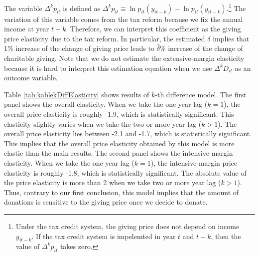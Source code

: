 \documentclass[
  11pt,
  a4paper,
]{article}
\begin{document}
  The variable \(\Delta^k p_{it}\) is defined as \(\Delta^k p_{it} \equiv \ln p_{it}(y_{it-k}) - \ln p_{it}(y_{it-k})\).\footnote{Under the tax credit system, the giving price does not depend on income \(y_{it-k}\). If the tax credit system is impelemted in year \(t\) and \(t-k\), then the value of \(\Delta^k p_{it}\) takes zero.}
  The variation of this variable comes from the tax reform because we fix the annual income at year \(t - k\).
  Therefore, we can interpret this coefficient as the giving price elasticity due to the tax reform.
  In particular, the estimated \(\delta\) implies that 1\% increase of the change of giving price leads to \(\hat{\delta}\)\% increase of the change of charitable giving.
  Note that we do not estimate the extensive-margin elasticity because it is hard to interpret this estimation equation when we use \(\Delta^k D_{it}\) as an outcome variable.

  Table \ref{tab:kablekDiffElasticity} shows results of \(k\)-th difference model.
  The first panel shows the overall elasticity.
  When we take the one year lag (\(k = 1\)), the overall price elasticity is roughly -1.9,
  which is statistically significant.
  This elasticity slightly varies when we take the two or more year lag (\(k > 1\)).
  The overall price elasticity lies between -2.1 and -1.7, which is statistically significant.
  This implies that the overall price elasticity obtained by this model is more elastic than the main results.
  The second panel shows the intensive-margin elasticity.
  When we take the one year lag (\(k = 1\)), the intensive-margin price elasticity is roughly -1.8,
  which is statistically significant.
  The absolute value of the price elasticity is more than 2
  when we take two or more year lag (\(k > 1\)).
  Thus, contrary to our first conclusion,
  this model implies that the amount of donations is sensitive to the giving price once we decide to donate.
\end{document}
